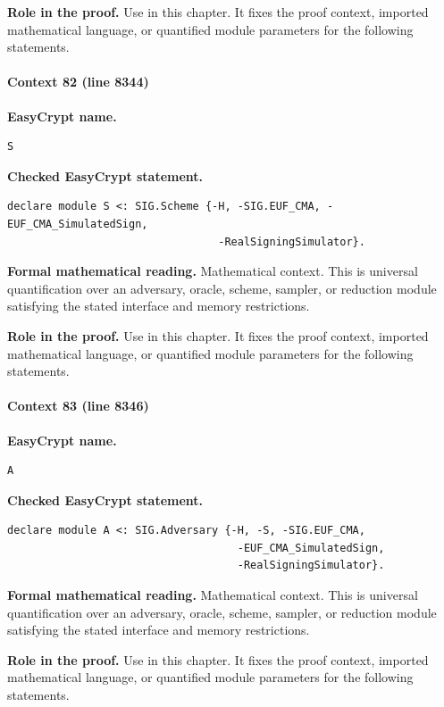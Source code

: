 \noindent\textbf{Role in the proof.}
Use in this chapter. It fixes the proof context, imported mathematical language, or quantified module parameters for the following statements.

\paragraph{Context 82 (line 8344)}
\noindent\textbf{EasyCrypt name.}
\begin{lstlisting}[language=EasyCrypt,basicstyle=\ttfamily\scriptsize]
S
\end{lstlisting}
\noindent\textbf{Checked EasyCrypt statement.}
\begin{lstlisting}[language=EasyCrypt,basicstyle=\ttfamily\scriptsize]
declare module S <: SIG.Scheme {-H, -SIG.EUF_CMA, -EUF_CMA_SimulatedSign,
                                 -RealSigningSimulator}.
\end{lstlisting}
\noindent\textbf{Formal mathematical reading.}
Mathematical context. This is universal quantification over an adversary, oracle, scheme, sampler, or reduction module satisfying the stated interface and memory restrictions.

\noindent\textbf{Role in the proof.}
Use in this chapter. It fixes the proof context, imported mathematical language, or quantified module parameters for the following statements.

\paragraph{Context 83 (line 8346)}
\noindent\textbf{EasyCrypt name.}
\begin{lstlisting}[language=EasyCrypt,basicstyle=\ttfamily\scriptsize]
A
\end{lstlisting}
\noindent\textbf{Checked EasyCrypt statement.}
\begin{lstlisting}[language=EasyCrypt,basicstyle=\ttfamily\scriptsize]
declare module A <: SIG.Adversary {-H, -S, -SIG.EUF_CMA,
                                    -EUF_CMA_SimulatedSign,
                                    -RealSigningSimulator}.
\end{lstlisting}
\noindent\textbf{Formal mathematical reading.}
Mathematical context. This is universal quantification over an adversary, oracle, scheme, sampler, or reduction module satisfying the stated interface and memory restrictions.

\noindent\textbf{Role in the proof.}
Use in this chapter. It fixes the proof context, imported mathematical language, or quantified module parameters for the following statements.

